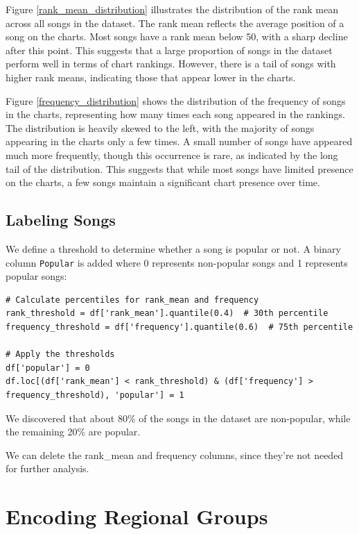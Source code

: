 Figure \ref{rank_mean_distribution} illustrates the distribution of the rank mean across all songs in the dataset. The rank mean reflects the average position of a song on the charts. Most songs have a rank mean below 50, with a sharp decline after this point. This suggests that a large proportion of songs in the dataset perform well in terms of chart rankings. However, there is a tail of songs with higher rank means, indicating those that appear lower in the charts.

Figure \ref{frequency_distribution} shows the distribution of the frequency of songs in the charts, representing how many times each song appeared in the rankings. The distribution is heavily skewed to the left, with the majority of songs appearing in the charts only a few times. A small number of songs have appeared much more frequently, though this occurrence is rare, as indicated by the long tail of the distribution. This suggests that while most songs have limited presence on the charts, a few songs maintain a significant chart presence over time.



\subsection{Labeling Songs}

We define a threshold to determine whether a song is popular or not. A binary column \texttt{Popular} is added where 0 represents non-popular songs and 1 represents popular songs:

\begin{verbatim}
# Calculate percentiles for rank_mean and frequency
rank_threshold = df['rank_mean'].quantile(0.4)  # 30th percentile
frequency_threshold = df['frequency'].quantile(0.6)  # 75th percentile

# Apply the thresholds
df['popular'] = 0
df.loc[(df['rank_mean'] < rank_threshold) & (df['frequency'] > frequency_threshold), 'popular'] = 1
\end{verbatim}

We discovered that about 80\% of the songs in the dataset are non-popular, while the remaining 20\% are popular.

We can delete the rank\_mean and frequency columns, since they're not needed for further analysis.


\section{Encoding Regional Groups}

